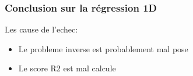 \begin{frame}
    \frametitle{Conclusion sur la régression 1D}
Les cause de l'echec:
\begin{itemize}
    \item Le probleme inverse est probablement mal pose  %
    \item Le score R2 est mal calcule %
\end{itemize}
\end{frame}


% 
